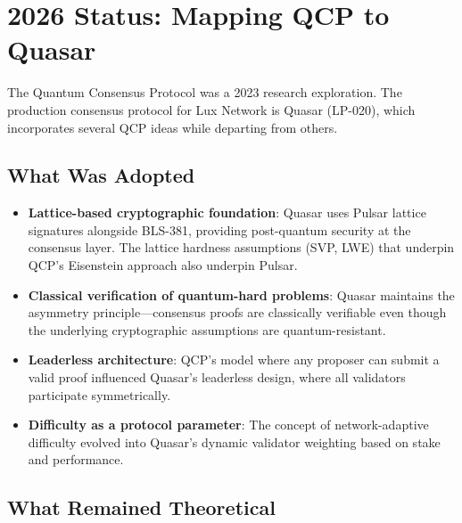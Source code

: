 \section{2026 Status: Mapping QCP to Quasar}
\label{sec:status}

The Quantum Consensus Protocol was a 2023 research exploration. The
production consensus protocol for Lux Network is Quasar (LP-020),
which incorporates several QCP ideas while departing from others.

\subsection{What Was Adopted}

\begin{itemize}[nosep]
  \item \textbf{Lattice-based cryptographic foundation}: Quasar uses
        Pulsar lattice signatures alongside BLS-381, providing
        post-quantum security at the consensus layer. The lattice
        hardness assumptions (SVP, LWE) that underpin QCP's Eisenstein
        approach also underpin Pulsar.
  \item \textbf{Classical verification of quantum-hard problems}: Quasar
        maintains the asymmetry principle---consensus proofs are
        classically verifiable even though the underlying cryptographic
        assumptions are quantum-resistant.
  \item \textbf{Leaderless architecture}: QCP's model where any
        proposer can submit a valid proof influenced Quasar's leaderless
        design, where all validators participate symmetrically.
  \item \textbf{Difficulty as a protocol parameter}: The concept of
        network-adaptive difficulty evolved into Quasar's dynamic
        validator weighting based on stake and performance.
\end{itemize}

\subsection{What Remained Theoretical}

